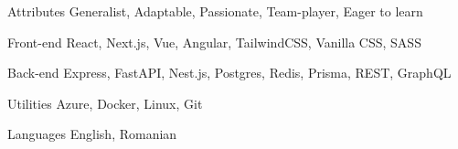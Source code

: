 

\begin{cvskills}

  \cvskill
    {Attributes} %
    {Generalist, Adaptable, Passionate, Team-player, Eager to learn} %

  \cvskill
    {Front-end} %
    {React, Next.js, Vue, Angular, TailwindCSS, Vanilla CSS, SASS} %

  \cvskill
    {Back-end} %
    {Express, FastAPI, Nest.js, Postgres, Redis, Prisma, REST, GraphQL} %

  \cvskill
    {Utilities} %
    {Azure, Docker, Linux, Git} %

  \cvskill
    {Languages} %
    {English, Romanian} %

\end{cvskills}
